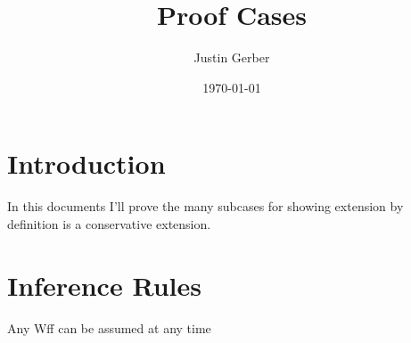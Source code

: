 \documentclass[12pt]{article}
\newcommand{\mc}[1]{\mathcal{#1}}
\begin{document}
\title{Proof Cases}
\author{Justin Gerber}
\date{\today}
\maketitle

\section*{Introduction}

In this documents I'll prove the many subcases for showing extension by definition is a conservative extension.


\section{Inference Rules}

\hrulefill
\begin{ND}[Rule of $A$][][][][.6\linewidth]
\ndljg{j}{(j)}{$\mc{A}$}{$A$}
\end{ND}
Any Wff can be assumed at any time
\end{document}
